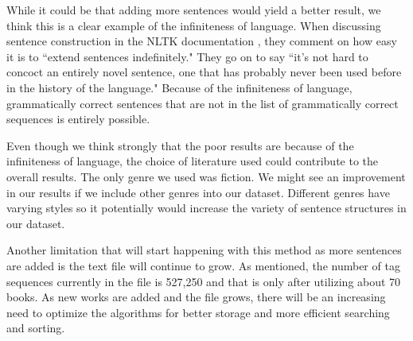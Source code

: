 \documentclass[11pt,a4paper]{article}
\begin{document}
\begin{multicols}{2}
While it could be that adding more sentences would yield a better result, we think this is a clear example of the infiniteness of language. When discussing sentence construction in the NLTK documentation \cite{nltk}, they comment on how easy it is to ``extend sentences indefinitely." They go on to say ``it's not hard to concoct an entirely novel sentence, one that has probably never been used before in the history of the language." Because of the infiniteness of language, grammatically correct sentences that are not in the list of grammatically correct sequences is entirely possible.

Even though we think strongly that the poor results are because of the infiniteness of language, the choice of literature used could contribute to the overall results. The only genre we used was fiction. We might see an improvement in our results if we include other genres into our dataset. Different genres have varying styles so it potentially would increase the variety of sentence structures in our dataset.

Another limitation that will start happening with this method as more sentences are added is the text file will continue to grow. As mentioned, the number of tag sequences currently in the file is 527,250 and that is only after utilizing about 70 books. As new works are added and the file grows, there will be an increasing need to optimize the algorithms for better storage and more efficient searching and sorting.


\end{multicols}
\end{document}

